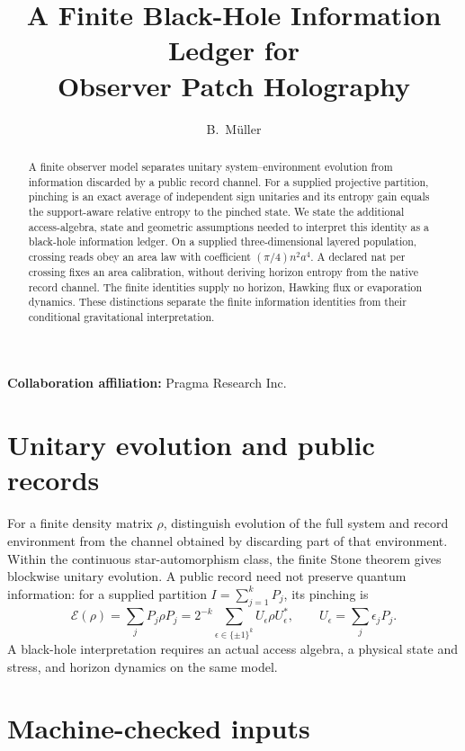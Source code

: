 \documentclass[11pt]{article}
\title{A Finite Black-Hole Information Ledger for\\
Observer Patch Holography}
\author{B.\ M\"uller}
\date{\OPHPaperReleaseDate}
\theoremstyle{remark}
\begin{document}
\maketitle
\OPHPaperReleaseBanner

\begin{center}
\small\textbf{Collaboration affiliation:} Pragma Research Inc.
\end{center}

\begin{abstract}
A finite observer model separates unitary system--environment evolution from
information discarded by a public record channel. For a supplied projective
partition, pinching is an exact average of independent sign unitaries and its
entropy gain equals the support-aware relative entropy to the pinched state.
We state the additional access-algebra, state and geometric assumptions needed
to interpret this identity as a black-hole information ledger. On a supplied
three-dimensional layered population, crossing reads obey an area law with
coefficient \((\pi/4)n^2a^4\). A declared nat per crossing fixes an area
calibration, without deriving horizon entropy from the native record channel.
The finite identities supply no horizon, Hawking flux or evaporation
dynamics. These distinctions
separate the finite information identities from their conditional gravitational
interpretation.

\end{abstract}


\section{Unitary evolution and public records}
For a finite density matrix \(\rho\), distinguish evolution of the full
system and record environment from the channel obtained by discarding part
of that environment. Within the continuous star-automorphism class, the
finite Stone theorem gives blockwise unitary evolution. A public record
need not preserve quantum information: for a supplied partition
\(I=\sum_{j=1}^kP_j\), its pinching is
\[
 \mathcal E(\rho)=\sum_jP_j\rho P_j
 =2^{-k}\sum_{\epsilon\in\{\pm1\}^k}
 U_\epsilon\rho U_\epsilon^*,\qquad U_\epsilon=\sum_j\epsilon_jP_j.
\]
A black-hole interpretation requires an actual access
algebra, a physical state and stress, and horizon dynamics on the same model.



\section{Machine-checked inputs}\label{sec:checked-inputs}
\end{document}
